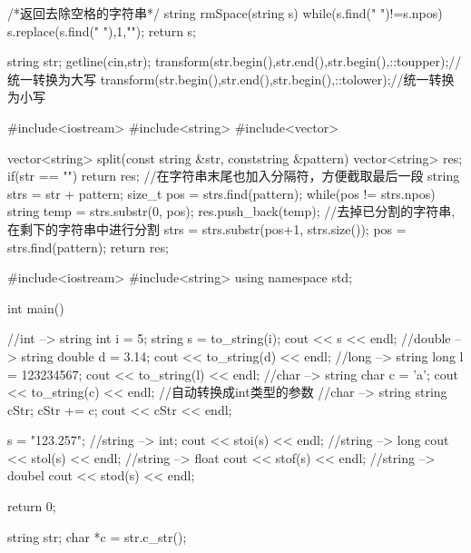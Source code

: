 \begin{NoteCode}
/*返回去除空格的字符串*/
string rmSpace(string s){
    while(s.find(" ")!=s.npos)
        s.replace(s.find(" "),1,"");
    return s;
}
\end{NoteCode}

\begin{NoteCode}
string str;
getline(cin,str);
transform(str.begin(),str.end(),str.begin(),::toupper);//统一转换为大写
transform(str.begin(),str.end(),str.begin(),::tolower);//统一转换为小写
\end{NoteCode}

\begin{NoteCode}
#include<iostream>
#include<string>
#include<vector>
 
vector<string> split(const string &str, conststring &pattern){
    vector<string> res;
    if(str == "") return res;
    //在字符串末尾也加入分隔符，方便截取最后一段
    string strs = str + pattern;
    size_t pos = strs.find(pattern);
    while(pos != strs.npos){
        string temp = strs.substr(0, pos);
        res.push_back(temp);
        //去掉已分割的字符串,在剩下的字符串中进行分割
        strs = strs.substr(pos+1, strs.size());
        pos = strs.find(pattern);
    }
    return res;
}
\end{NoteCode}

\begin{NoteCode}
#include<iostream>
#include<string>
using namespace std;

int main(){
    //int --> string
    int i = 5;
    string s = to_string(i);
    cout << s << endl;
    //double --> string
    double d = 3.14;
    cout << to_string(d) << endl;
    //long --> string
    long l = 123234567;
    cout << to_string(l) << endl;
    //char --> string
    char c = 'a';
    cout << to_string(c) << endl;   //自动转换成int类型的参数
    //char --> string
    string cStr; cStr += c;
    cout << cStr << endl;
 
    s = "123.257";
    //string --> int;
    cout << stoi(s) << endl;
    //string --> long
    cout << stol(s) << endl;
    //string --> float
    cout << stof(s) << endl;
    //string --> doubel
    cout << stod(s) << endl;
 
  return 0;
}
\end{NoteCode}

\begin{NoteCode}
string str;
char *c = str.c_str();
\end{NoteCode}

